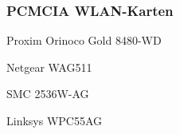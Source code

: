 \subsubsection{PCMCIA WLAN-Karten}

\begin{wlandevice}{Proxim Orinoco Gold 8480-WD}
\wlanchipset
\wlanieeestandard
\wlanmode
\wlansecurity
\wlandriver
\wlanprice
\wlaninstall
\end{wlandevice}

\begin{wlandevice}{Netgear WAG511}
\wlanchipset
\wlanieeestandard
\wlanmode
\wlansecurity
\wlandriver
\wlanprice
\wlaninstall
\end{wlandevice}

\begin{wlandevice}{SMC 2536W-AG}
\wlanchipset
\wlanieeestandard
\wlanmode
\wlansecurity
\wlandriver
\wlanprice
\wlaninstall
\end{wlandevice}

\begin{wlandevice}{Linksys WPC55AG}
\wlanchipset
\wlanieeestandard
\wlanmode
\wlansecurity
\wlandriver
\wlanprice
\wlaninstall
\end{wlandevice}
